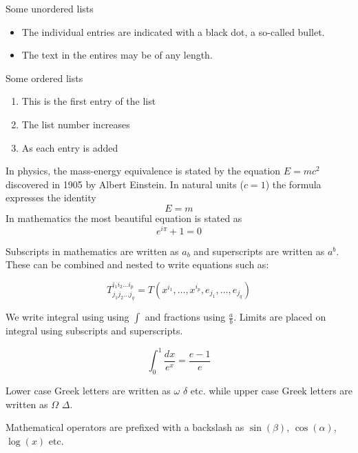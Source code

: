 \documentclass[12pt, a4paper]{article}
\begin{document}
Some unordered lists
\begin{itemize}
    \item The individual entries are indicated with a black dot, a so-called bullet.
    \item The text in the entires may be of any length.
\end{itemize}

Some ordered lists
\begin{enumerate}
    \item This is the first entry of the list
    \item The list number increases
    \item As each entry is added
\end{enumerate}

In physics, the mass-energy equivalence is stated by the equation $E = mc^2$ discovered in 1905 by Albert Einstein. %
In natural units ($c = 1$) the formula expresses the identity
\[ E = m \] %
In mathematics the most beautiful equation is stated as
\begin{equation}
    e^{i\pi} + 1 = 0
\end{equation}



Subscripts in mathematics are written as $a_b$ and superscripts are written as $a^b$. These can be combined and nested to write equations such as:

\[ T^{i_1 i_2 \dots i_p}_{j_1 j_2 \dots j_q} = T(x^{i_1},\dots,x^{i_p},e_{j_1},\dots,e_{j_q}) \]

We write integral using using $\int$ and fractions using $\frac{a}{b}$. Limits are placed on integral using subscripts and superscripts.

\[ \int_0^1 \frac{dx}{e^x} =  \frac{e-1}{e} \]

Lower case Greek letters are written as $\omega$ $\delta$ etc. while upper case Greek letters are written as $\Omega$ $\Delta$.

Mathematical operators are prefixed with a backslash as $\sin(\beta)$, $\cos(\alpha)$, $\log(x)$ etc.
\end{document}
